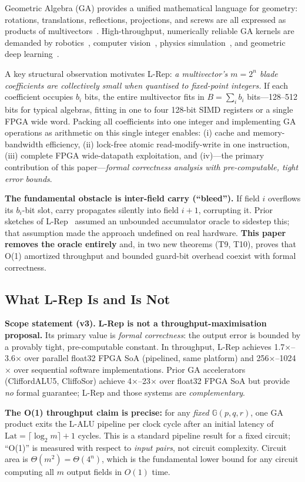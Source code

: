 \documentclass[11pt,a4paper]{article}
\theoremstyle{definition}
\theoremstyle{plain}
\theoremstyle{remark}
\newcommand{\GA}{\mathbb{G}}
\newcommand{\ceil}[1]{\lceil #1 \rceil}
\newcommand{\Latency}{\mathrm{Lat}}
\begin{document}
Geometric Algebra (GA) provides a unified mathematical language for
geometry: rotations, translations, reflections, projections, and
screws are all expressed as products of multivectors~\cite{hestenes1984,dorst2007}.
High-throughput, numerically reliable GA kernels are demanded by
robotics~\cite{selig2005}, computer vision~\cite{lasenby1998},
physics simulation~\cite{doran2003}, and geometric deep
learning~\cite{brandstetter2023}.

A key structural observation motivates L-Rep:
\emph{a multivector's $m = 2^n$ blade coefficients are collectively
small when quantised to fixed-point integers.}
If each coefficient occupies $b_i$ bits, the entire multivector fits in
$B = \sum_i b_i$ bits---128--512 bits for typical algebras,
fitting in one to four 128-bit SIMD registers or a single FPGA wide word.
Packing all coefficients into one integer and implementing GA operations
as arithmetic on this single integer enables:
(i) cache and memory-bandwidth efficiency,
(ii) lock-free atomic read-modify-write in one instruction,
(iii) complete FPGA wide-datapath exploitation, and
(iv)---the primary contribution of this paper---\emph{formal correctness
analysis with pre-computable, tight error bounds}.

\textbf{The fundamental obstacle is inter-field carry (``bleed'').}
If field $i$ overflows its $b_i$-bit slot, carry propagates silently
into field $i+1$, corrupting it.
Prior sketches of L-Rep~\cite{dang2025sketch} assumed an unbounded
accumulator oracle to sidestep this; that assumption made the approach
undefined on real hardware.
\textbf{This paper removes the oracle entirely} and, in two new theorems
(T9, T10), proves that O(1) amortized throughput and bounded guard-bit
overhead coexist with formal correctness.

\subsection{What L-Rep Is and Is Not}

\begin{warningbox}
\textbf{Scope statement (v3).}
\textbf{L-Rep is not a throughput-maximisation proposal.}
Its primary value is \emph{formal correctness}: the output error is
bounded by a provably tight, pre-computable constant.
In throughput, L-Rep achieves 1.7$\times$--3.6$\times$ over parallel
float32 FPGA SoA (pipelined, same platform) and
256$\times$--1024$\times$ over sequential software implementations.
Prior GA accelerators (CliffordALU5, CliffoSor) achieve
4$\times$--23$\times$ over float32 FPGA SoA but provide \emph{no}
formal guarantee; L-Rep and those systems are \emph{complementary}.

\textbf{The O(1) throughput claim is precise:}
for any \emph{fixed} $\GA(p,q,r)$, one GA product exits the L-ALU
pipeline per clock cycle after an initial latency of
$\Latency = \ceil{\log_2 m} + 1$ cycles.
This is a standard pipeline result for a fixed circuit;
``O(1)'' is measured with respect to \emph{input pairs},
not circuit complexity.
Circuit area is $\Theta(m^2) = \Theta(4^n)$, which
is the fundamental lower bound for any circuit computing all $m$
output fields in $O(1)$ time.
\end{warningbox}
\end{document}
